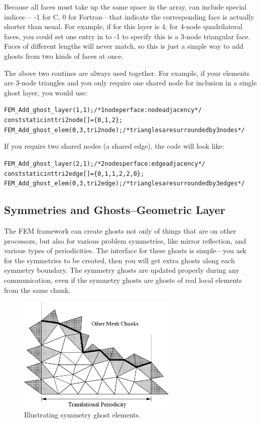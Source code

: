 \begin{itemize}
Because all faces must take up the same space in the array,
 can include special indices--- -1 for C, 0 for Fortran---that indicate the
corresponding face is actually shorter than usual.  For example, if  for this layer
is 4, for 4-node quadrilateral faces, you could set one entry in  to -1 to specify
this is a 3-node triangular face.  Faces of different lengths will never match, so this is just
a simple way to add ghosts from two kinds of faces at once.

\end{itemize}

The above two routines are always used together. For example, if your elements are 3-node triangles and you only require one shared node for inclusion in a single ghost layer, you would use:
\begin{alltt}
   FEM\_Add\_ghost\_layer(1,1); /* 1 node per face: node adjacency */
   const static int tri2node[]=\{0,1,2\};
   FEM\_Add\_ghost\_elem(0,3,tri2node); /* triangles are surrounded by 3 nodes */
\end{alltt}

If you require two shared nodes (a shared edge), the code will look like:
\begin{alltt}    
   FEM\_Add\_ghost\_layer(2,1); /* 2 nodes per face: edge adjacency */
   const static int tri2edge[]=\{0,1,  1,2,  2,0\};
   FEM\_Add\_ghost\_elem(0,3,tri2edge); /*triangles are surrounded by 3 edges */
\end{alltt}


\subsection{Symmetries and Ghosts--Geometric Layer}

The FEM framework can create ghosts not only of things that are on other 
processors, but also for various problem symmetries, like mirror reflection,
and various types of periodicities.  The interface for these ghosts is 
simple---you ask for the symmetries to be created, then you will get 
extra ghosts along each symmetry boundary.  The symmetry ghosts are
updated properly during any communication, even if the symmetry ghosts
are ghosts of real local elements from the same chunk.


\begin{figure}[h]
\begin{center}
\includegraphics[width=3in]{fig/sym_ghost}
\end{center}
\caption{Illustrating symmetry ghost elements.}
\label{fig:symghost}
\end{figure}

